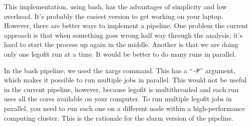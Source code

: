 \documentclass[11pt]{article}
\begin{document}
This implementation, using bash, has the advantages of simplicity and
low overhead. It's probably the easiest version to get working on your
laptop. However, there are better ways to implement a pipeline. One
problem the current approach is that when something goes wrong half
way through the analysis, it's hard to start the process up again in
the middle. Another is that we are doing only one legofit run at a
time. It would be better to do many runs in parallel.

In the bash pipeline, we used the xargs command. This has a
``\texttt{-P}'' argument, which makes it possible to run multiple jobs
in parallel. This would not be useful in the current pipeline,
however, because legofit is multithreaded and each run uses all the
cores available on your computer. To run multiple legofit jobs in
parallel, you need to run each one on a different node within a
high-performance computing cluster. This is the rationale for the
slurm version of the pipeline.
\end{document}
